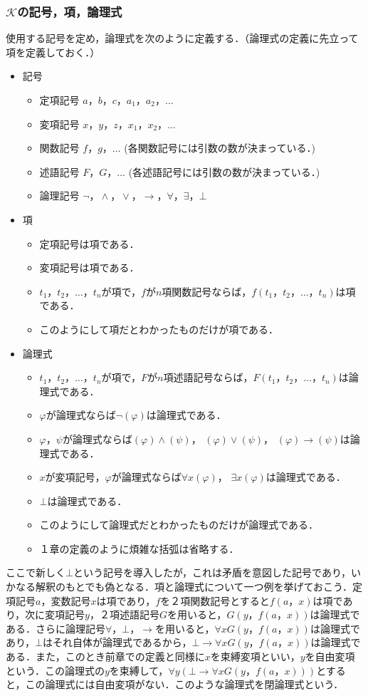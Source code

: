 \documentclass[10pt,b5paper,papersize,dvipdfmx]{jsbook}
\begin{document}
\subsubsection{$\mathcal K$の記号，項，論理式}
使用する記号を定め，論理式を次のように定義する．（論理式の定義に先立って項を定義しておく．）
\begin{itemize}
\item 記号
\begin{itemize}
\item 定項記号 $a，b，c，a_1，a_2，\dots$
\item 変項記号 $x，y，z，x_1，x_2，\dots$
\item 関数記号 $f，g，\dots$ (各関数記号には引数の数が決まっている．)
\item 述語記号 $F，G，\dots$ (各述語記号には引数の数が決まっている．)
\item 論理記号 $\lnot，\land，\lor，\to，\forall，\exists，\bot$
\end{itemize}
\item 項
\begin{itemize}
\item 定項記号は項である．
\item 変項記号は項である．
\item $t_1，t_2，\dots，t_n$が項で，$f$が$n$項関数記号ならば，$f(t_1，t_2，\dots，t_n)$は項である．
\item このようにして項だとわかったものだけが項である．
\end{itemize}
\item 論理式
\begin{itemize}
\item $t_1，t_2，\dots，t_n$が項で，$F$が$n$項述語記号ならば，$F(t_1，t_2，\dots，t_n)$は論理式である．
\item $\varphi$が論理式ならば$\lnot (\varphi)$は論理式である．
\item $\varphi，\psi$が論理式ならば$(\varphi) \land (\psi)$， $(\varphi) \lor (\psi)$， $(\varphi) \to (\psi)$は論理式である．
\item $x$が変項記号，$\varphi$が論理式ならば$\forall x (\varphi)$， $\exists x (\varphi)$は論理式である．
\item $\bot$は論理式である．
\item このようにして論理式だとわかったものだけが論理式である．
\item １章の定義のように煩雑な括弧は省略する．
\end{itemize}
\end{itemize}
ここで新しく$\bot$という記号を導入したが，これは矛盾を意図した記号であり，いかなる解釈のもとでも偽となる．項と論理式について一つ例を挙げておこう．定項記号$a$，変数記号$x$は項であり，$f$を２項関数記号とすると$f(a，x)$は項であり，次に変項記号$y$，２項述語記号$G$を用いると，$G(y，f(a，x))$は論理式である．さらに論理記号$\forall，\bot，\to$を用いると，$\forall xG(y，f(a，x))$は論理式であり，$\bot$はそれ自体が論理式であるから，$\bot \to \forall xG(y，f(a，x))$は論理式である．また，このとき前章での定義と同様に$x$を束縛変項といい，$y$を自由変項という．この論理式の$y$を束縛して，$\forall y(\bot \to \forall xG(y，f(a，x)))$とすると，この論理式には自由変項がない．このような論理式を閉論理式という．
\end{document}
